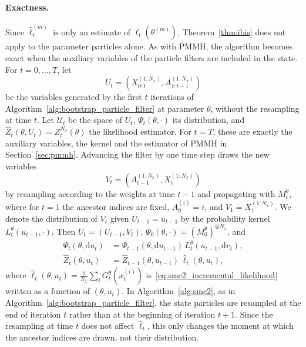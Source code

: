 \paragraph{Exactness.}
Since $\hat{\ell}_t^{(m)}$ is only an estimate of $\ell_t(\theta^{(m)})$, Theorem~\ref{thm:ibis} does not apply to the parameter particles alone. As with PMMH, the algorithm becomes exact when the auxiliary variables of the particle filters are included in the state. For $t=0,\ldots,T$, let
\begin{equation}
    U_t = \left(X_{0:t}^{(1:N_x)},A_{1:t-1}^{(1:N_x)}\right)
\end{equation}
be the variables generated by the first $t$ iterations of Algorithm~\ref{alg:bootstrap_particle_filter} at parameter $\theta$, without the resampling at time $t$. Let $\mathcal{U}_t$ be the space of $U_t$, $\Psi_t(\theta,\cdot)$ its distribution, and $\hat{Z}_t(\theta,U_t) = Z_t^{N_x}(\theta)$ the likelihood estimator. For $t=T$, these are exactly the auxiliary variables, the kernel and the estimator of PMMH in Section~\ref{sec:pmmh}. Advancing the filter by one time step draws the new variables
\begin{equation}
    V_t = \left(A_{t-1}^{(1:N_x)},X_t^{(1:N_x)}\right)
\end{equation}
by resampling according to the weights at time $t-1$ and propagating with $M_t^\theta$, where for $t=1$ the ancestor indices are fixed, $A_0^{(i)} = i$, and $V_1 = X_1^{(1:N_x)}$. We denote the distribution of $V_t$ given $U_{t-1} = u_{t-1}$ by the probability kernel $L_t^\theta(u_{t-1},\cdot)$. Then $U_t = (U_{t-1},V_t)$, $\Psi_0(\theta,\cdot) = (M_0^\theta)^{\otimes N_x}$, and
\begin{align}
    \Psi_t(\theta,\mathrm{d}u_t) &= \Psi_{t-1}(\theta,\mathrm{d}u_{t-1})\,L_t^\theta(u_{t-1},\mathrm{d}v_t), \\
    \hat{Z}_t(\theta,u_t) &= \hat{Z}_{t-1}(\theta,u_{t-1})\,\hat{\ell}_t(\theta,u_t),
    \label{eq:smc2_auxiliary_recursion}
\end{align}
where $\hat{\ell}_t(\theta,u_t) = \frac{1}{N_x}\sum_iG_t^\theta(x_t^{(i)})$ is~\eqref{eq:smc2_incremental_likelihood} written as a function of $(\theta,u_t)$. In Algorithm~\ref{alg:smc2}, as in Algorithm~\ref{alg:bootstrap_particle_filter}, the state particles are resampled at the end of iteration $t$ rather than at the beginning of iteration $t+1$. Since the resampling at time $t$ does not affect $\hat{\ell}_t$, this only changes the moment at which the ancestor indices are drawn, not their distribution.

